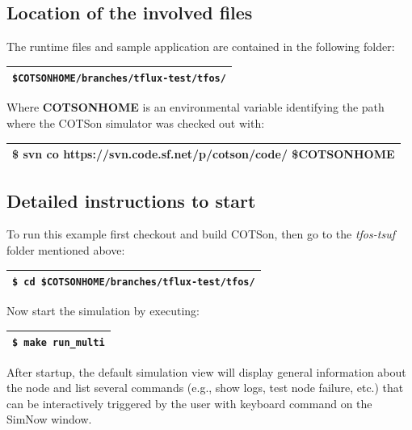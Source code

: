 \documentclass[a4paper]{article}
\begin{document}
\subsection[Location of the involved files]{Location of the involved
files}
{
The runtime files and sample application are contained in the following
folder:}

\begin{flushleft}
\tablehead{}
\begin{supertabular}{|m{6.29346in}|}
\hline
{}
\texttt{\$COTSONHOME/branches/tflux-test/tfos/}\\\hline
\end{supertabular}
\end{flushleft}
{
Where \textbf{COTSONHOME }is an environmental variable identifying the
path where the COTSon simulator was checked out with: }

\begin{flushleft}
\tablehead{}
\begin{supertabular}{|m{6.29346in}|}
\hline
{}\ttfamily \$ svn co
https://svn.code.sf.net/p/cotson/code/ \$COTSONHOME\\\hline
\end{supertabular}
\end{flushleft}
\subsection[Detailed instructions to start]{Detailed instructions to
start}
{
To run this example first checkout and build COTSon, then go to the
\textit{tfos-tsuf} folder mentioned above:}

\begin{flushleft}
\tablehead{}
\begin{supertabular}{|m{6.29346in}|}
\hline
{} \texttt{\$ cd
\$COTSONHOME/branches/tflux-test/tfos/}\\\hline
\end{supertabular}
\end{flushleft}
{
Now start the simulation by executing:}

\begin{flushleft}
\tablehead{}
\begin{supertabular}{|m{6.29346in}|}
\hline
{} \texttt{\$ make run\_multi}\\\hline
\end{supertabular}
\end{flushleft}
{
After startup, the default simulation view will display general
information about the node and list several commands (e.g., show logs,
test node failure, etc.) that can be interactively triggered by the
user with keyboard command on the SimNow window.}
\end{document}
